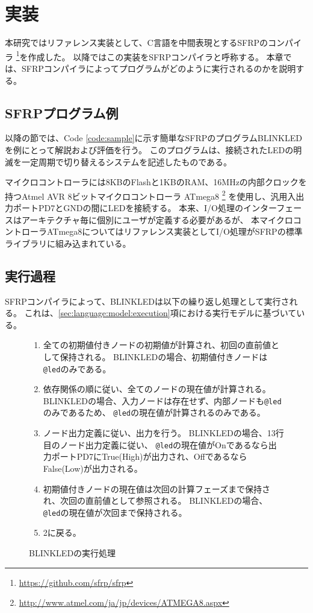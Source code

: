 \chapter{実装}\label{sec:implementation}
本研究ではリファレンス実装として、C言語を中間表現とするSFRPのコンパイラ
\footnote{\url{https://github.com/sfrp/sfrp}}を作成した。
以降ではこの実装をSFRPコンパイラと呼称する。
本章では、SFRPコンパイラによってプログラムがどのように実行されるのかを説明する。

\section{SFRPプログラム例}\label{sec:implementation:example}
以降の節では、Code \ref{code:sample}に示す簡単なSFRPのプログラムBLINKLEDを例にとって解説および評価を行う。
このプログラムは、接続されたLEDの明滅を一定周期で切り替えるシステムを記述したものである。

マイクロコントローラには8KBのFlashと1KBのRAM、16MHzの内部クロックを持つAtmel AVR 8ビットマイクロコントローラ ATmega8
\footnote{\url{http://www.atmel.com/ja/jp/devices/ATMEGA8.aspx}}
を使用し、汎用入出力ポートPD7とGNDの間にLEDを接続する。
本来、I/O処理のインターフェースはアーキテクチャ毎に個別にユーザが定義する必要があるが、
本マイクロコントローラATmega8についてはリファレンス実装としてI/O処理がSFRPの標準ライブラリに組み込まれている。

\newpage



\section{実行過程}\label{sec:implementation:execution}
SFRPコンパイラによって、BLINKLEDは以下の繰り返し処理として実行される。
これは、\ref{sec:language:model:execution}項における実行モデルに基づいている。
\begin{figure}[h]
\begin{screen}
\begin{enumerate}
  \item 全ての初期値付きノードの初期値が計算され、初回の直前値として保持される。
    BLINKLEDの場合、初期値付きノードは\texttt{@led}のみである。
  \item 依存関係の順に従い、全てのノードの現在値が計算される。
    BLINKLEDの場合、入力ノードは存在せず、内部ノードも\texttt{@led}のみであるため、
    \texttt{@led}の現在値が計算されるのみである。
  \item ノード出力定義に従い、出力を行う。
    BLINKLEDの場合、13行目のノード出力定義に従い、
    \texttt{@led}の現在値がOnであるなら出力ポートPD7にTrue(High)が出力され、OffであるならFalse(Low)が出力される。
  \item 初期値付きノードの現在値は次回の計算フェーズまで保持され、次回の直前値として参照される。
    BLINKLEDの場合、\texttt{@led}の現在値が次回まで保持される。
  \item 2に戻る。
\end{enumerate}
\end{screen}
\caption{BLINKLEDの実行処理}
\label{fig:imp:exec}
\end{figure}


